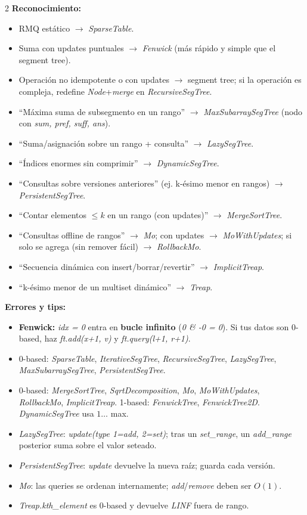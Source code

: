 \documentclass[10pt]{article}
\begin{document}
\begin{multicols}{2}
\textbf{Reconocimiento:}
\begin{itemize}\setlength{\itemsep}{1pt}
  \item RMQ estático $\to$ \textit{SparseTable}.
  \item Suma con updates puntuales $\to$ \textit{Fenwick} (más rápido y simple que el segment tree).
  \item Operación no idempotente o con updates $\to$ segment tree; si la operación es compleja, redefine \textit{Node}+\textit{merge} en \textit{RecursiveSegTree}.
  \item ``Máxima suma de subsegmento en un rango'' $\to$ \textit{MaxSubarraySegTree} (nodo con \textit{sum, pref, suff, ans}).
  \item ``Suma/asignación sobre un rango + consulta'' $\to$ \textit{LazySegTree}.
  \item ``Índices enormes sin comprimir'' $\to$ \textit{DynamicSegTree}.
  \item ``Consultas sobre versiones anteriores'' (ej. k-ésimo menor en rangos) $\to$ \textit{PersistentSegTree}.
  \item ``Contar elementos $\le k$ en un rango (con updates)'' $\to$ \textit{MergeSortTree}.
  \item ``Consultas offline de rangos'' $\to$ \textit{Mo}; con updates $\to$ \textit{MoWithUpdates}; si solo se agrega (sin remover fácil) $\to$ \textit{RollbackMo}.
  \item ``Secuencia dinámica con insert/borrar/revertir'' $\to$ \textit{ImplicitTreap}.
  \item ``k-ésimo menor de un multiset dinámico'' $\to$ \textit{Treap}.
\end{itemize}

\textbf{Errores y tips:}
\begin{itemize}\setlength{\itemsep}{1pt}
  \item \textbf{Fenwick:} \textit{idx = 0} entra en \textbf{bucle infinito} (\textit{0 \& -0 = 0}). Si tus datos son 0-based, haz \textit{ft.add(x+1, v)} y \textit{ft.query(l+1, r+1)}.
  \item 0-based: \textit{SparseTable}, \textit{IterativeSegTree}, \textit{RecursiveSegTree}, \textit{LazySegTree}, \textit{MaxSubarraySegTree}, \textit{PersistentSegTree}.
  \item 0-based: \textit{MergeSortTree}, \textit{SqrtDecomposition}, \textit{Mo}, \textit{MoWithUpdates}, \textit{RollbackMo}, \textit{ImplicitTreap}. 1-based: \textit{FenwickTree}, \textit{FenwickTree2D}. \textit{DynamicSegTree} usa $1 \dots$ max.
  \item \textit{LazySegTree}: \textit{update(type 1=add, 2=set)}; tras un \textit{set\_range}, un \textit{add\_range} posterior suma sobre el valor seteado.
  \item \textit{PersistentSegTree}: \textit{update} devuelve la nueva raíz; guarda cada versión.
  \item \textit{Mo}: las queries se ordenan internamente; \textit{add}/\textit{remove} deben ser $O(1)$.
  \item \textit{Treap.kth\_element} es 0-based y devuelve \textit{LINF} fuera de rango.
\end{itemize}


\end{multicols}
\end{document}
